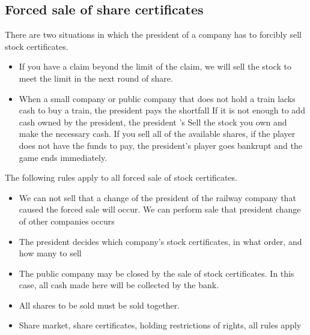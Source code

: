 \documentclass{article}
\begin{document}
\begin{CJK}{UTF8}{min}



\section{Forced sale of share certificates}

There are two situations in which the president of a company has to
forcibly sell stock certificates.
\begin{itemize}
\item If you have a claim beyond the limit of the claim, we will sell
  the stock to meet the limit in the next round of share.

\item When a small company or public company that does not hold a
  train lacks cash to buy a train, the president pays the shortfall If
  it is not enough to add cash owned by the president, the president
  ’s Sell ​​the stock you own and make the necessary cash. If you sell
  all of the available shares, if the player does not have the funds
  to pay, the president's player goes bankrupt and the game ends
  immediately.
\end{itemize}

The following rules apply to all forced sale of stock certificates.
\begin{itemize}
\item We can not sell that a change of the president of the railway
  company that caused the forced sale will occur. We can perform sale
  that president change of other companies occurs

\item The president decides which company's stock certificates, in
  what order, and how many to sell

\item The public company may be closed by the sale of stock
  certificates. In this case, all cash made here will be collected by
  the bank.

\item All shares to be sold must be sold together.

\item Share market, share certificates, holding restrictions of
  rights, all rules apply


\end{itemize}
\end{CJK}
\end{document}
